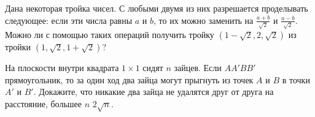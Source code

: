 
\begin{problems}

\item
Дана некоторая тройка чисел.
С любыми двумя из них разрешается проделывать следующее:
если эти числа равны $a$ и $b$, то их можно заменить на
$\frac{a + b}{\sqrt{2}}$ и $\frac{a - b}{\sqrt{2}}$.
Можно ли с помощью таких операций получить тройку
$(1 - \sqrt{2}, 2, \sqrt{2})$ из тройки $(1, \sqrt{2}, 1 + \sqrt{2})$?

\item
На плоскости внутри квадрата $1 \times 1$ сидят $n$ зайцев.
Если $A A' B B'$ прямоугольник, то за один ход два зайца могут прыгнуть из
точек $A$ и $B$ в точки $A'$ и $B'$.
Докажите, что никакие два зайца не удалятся друг от друга на расстояние,
большее
\quad
\sp $n$
\quad
\sp $2 \sqrt{n}$.

\end{problems}

